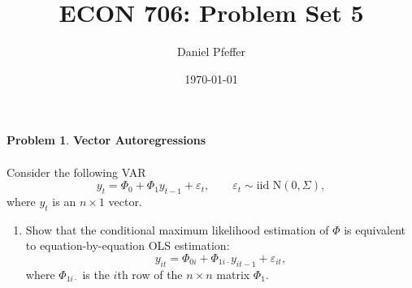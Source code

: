 \documentclass[oneside,reqno]{amsart}
\title{ECON 706: Problem Set 5}
\author{Daniel Pfeffer}
\date{\today}
\newcommand{\eps}{\varepsilon}
\theoremstyle{definition}
\newtheorem{prob}{Problem}
\begin{document}
\maketitle

\begin{prob}
\textbf{Vector Autoregressions} 
\\ \\
Consider the following VAR
\[
	y_t = \Phi_0 + \Phi_1 y_{t-1} + \eps_t,
	\qquad 
	\eps_t \sim \text{iid N}(0, \Sigma),
\]
where $y_t$ is an $n \times 1$ vector. 
\end{prob}

\begin{enumerate}
\item
Show that the conditional maximum likelihood estimation of $\Phi$ is equivalent to equation-by-equation OLS estimation:
\[
	y_{it} = \Phi_{0i} + \Phi_{1i \cdot} y_{it-1} + \eps_{it},
\]	
where $\Phi_{1i \cdot}$ is the $i$th row of the $n\times n$ matrix $\Phi_1$.


\end{enumerate}
\end{document}
